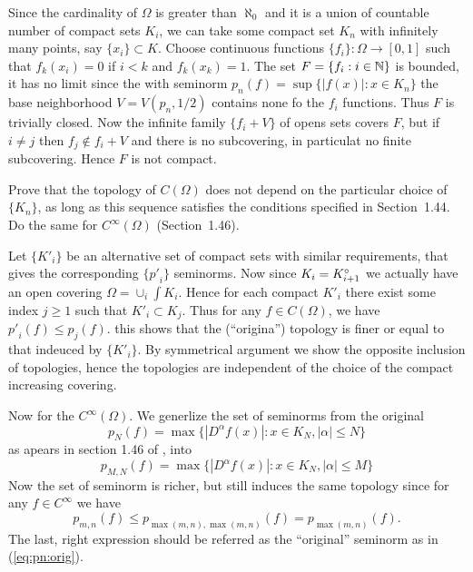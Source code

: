 \begin{enumerate}
Since the cardinality of \(\Omega\) is greater than \(\aleph_0\)
and it is a union of countable number of compact sets \(K_i\), we can
take some compact set $K_n$ with infinitely many points,
say \(\{x_i\}\subset K\). Choose continuous 
functions \(\{f_i\}: \Omega\rightarrow [0,1]\) 
such that
\(f_k(x_i) = 0\) if \(i < k\) and \(f_k(x_k) = 1\).
The set \(F = \{f_i:i\in \mathbb{N}\}\) is bounded, it has no limit
since the with seminorm \(p_n(f) = \sup\{|f(x)|: x\in K_n\}\)
the base neighborhood \(V = V(p_n,1/2)\) contains none fo the \(f_i\) functions.
Thus $F$ is trivially closed. Now the infinite family \(\{f_i+V\}\) of
opens sets covers $F$, but if \(i\neq j\) then \(f_j\notin f_i+V\)
and there is no subcovering, in particulat no finite subcovering.
Hence $F$ is not compact.



\begin{excopy}
Prove that the topology of \(C(\Omega)\) does not depend on the particular
choice of \(\{K_n\}\), as long as this sequence satisfies the conditions
specified in Section~1.44. Do the same for \(C^\infty(\Omega)\) (Section~1.46).
\end{excopy}

Let \(\{K'_i\}\) be an alternative set of compact sets with similar
requirements, that gives the corresponding \(\{{p'}_i\}\) seminorms.
Now since \(K_i = K_{i+1}^{\circ}\) we actually have an open covering
\(\Omega = \cup_i \int K_i\). Hence for each compact \(K'_i\)
there exist some index \(j\geq1\) such that \(K'_i \subset K_j\).
Thus for any \(f\in C(\Omega)\), we have
\({p'}_i(f) \leq p_j(f)\). this shows that the (``origina'') topology
is finer or equal to that indeuced by \(\{K'_i\}\). By symmetrical argument
we show the opposite inclusion of topologies, hence the topologies
are independent of the choice of the compact increasing covering.

Now for the \(C^\infty(\Omega)\). We generlize the set of seminorms
from the original 
\begin{equation} \label{eq:pn:orig}
 p_N(f) = \max\{|D^\alpha f(x)|: x\in K_N, |\alpha| \leq N\}
\end{equation}
as apears in section 1.46 of \cite{RudinFA79}, into
\begin{equation*}
 p_{M,N}(f) = \max\{|D^\alpha f(x)|: x\in K_N, |\alpha| \leq M\}
\end{equation*}
Now the set of seminorm is richer, but still induces the same topology
since for any \(f\in C^\infty\) we have
\begin{equation*}
 p_{m,n}(f) \leq p_{\max(m,n),\max(m,n)} (f) =  p_{\max(m,n)}(f).
\end{equation*}
The last, right expression should be referred as the ``original'' seminorm
as in (\ref{eq:pn:orig}).


\end{enumerate}
